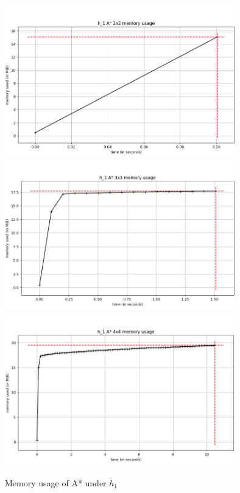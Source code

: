 \documentclass[runningheads]{llncs}
\begin{document}
\begin{figure}
    \begin{center}
        \includegraphics[width=10cm]{images/a_star_h1_2x2.png}
        \includegraphics[width=10cm]{images/a_star_h1_3x3.png}
        \includegraphics[width=10cm]{images/a_star_h1_4x4.png}
        \caption{Memory usage of A* under $h_1$} \label{fig2}
    \end{center}
\end{figure}
    
\end{document}
